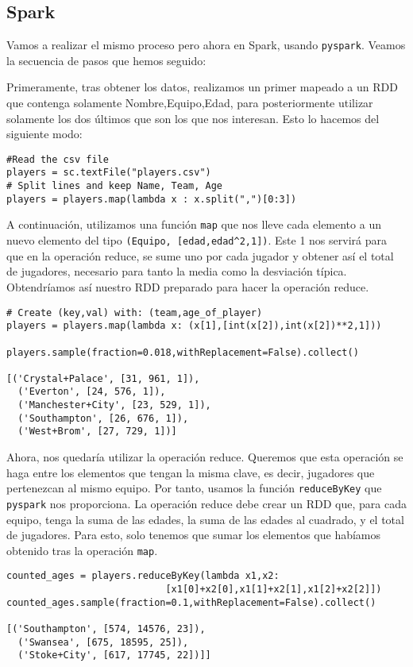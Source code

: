 \documentclass[11pt]{article}
\def\inline{\lstinline[basicstyle=\ttfamily,keywordstyle={}]}
\begin{document}
\subsection{Spark}

Vamos a realizar el mismo proceso pero ahora en Spark, usando \inline{pyspark}. Veamos la secuencia de pasos que hemos seguido:

Primeramente, tras obtener los datos, realizamos un primer mapeado a un RDD que contenga solamente Nombre,Equipo,Edad, para posteriormente utilizar solamente los dos últimos que son los que nos interesan. Esto lo hacemos del siguiente modo:

\begin{verbatim}
#Read the csv file
players = sc.textFile("players.csv")
# Split lines and keep Name, Team, Age
players = players.map(lambda x : x.split(",")[0:3])
\end{verbatim}

A continuación, utilizamos una función \inline{map} que nos lleve cada elemento a un nuevo elemento del tipo \inline{(Equipo, [edad,edad^2,1])}. Este 1 nos servirá para que en la operación reduce, se sume uno por cada jugador y obtener así el total de jugadores, necesario para tanto la media como la desviación típica. Obtendríamos así nuestro RDD preparado para hacer la operación reduce.

\begin{verbatim}
# Create (key,val) with: (team,age_of_player)
players = players.map(lambda x: (x[1],[int(x[2]),int(x[2])**2,1]))

players.sample(fraction=0.018,withReplacement=False).collect()

[('Crystal+Palace', [31, 961, 1]),
  ('Everton', [24, 576, 1]),
  ('Manchester+City', [23, 529, 1]),
  ('Southampton', [26, 676, 1]),
  ('West+Brom', [27, 729, 1])]
\end{verbatim}

Ahora, nos quedaría utilizar la operación reduce. Queremos que esta operación se haga entre los elementos que tengan la misma clave, es decir, jugadores que pertenezcan al mismo equipo. Por tanto, usamos la función \inline{reduceByKey} que \inline{pyspark} nos proporciona. La operación reduce debe crear un RDD que, para cada equipo, tenga la suma de las edades, la suma de las edades al cuadrado, y el total de jugadores. Para esto, solo tenemos que sumar los elementos que habíamos obtenido tras la operación \inline{map}.

\begin{verbatim}
counted_ages = players.reduceByKey(lambda x1,x2:
                            [x1[0]+x2[0],x1[1]+x2[1],x1[2]+x2[2]])
counted_ages.sample(fraction=0.1,withReplacement=False).collect()

[('Southampton', [574, 14576, 23]),
  ('Swansea', [675, 18595, 25]),
  ('Stoke+City', [617, 17745, 22])]]
\end{verbatim}
\end{document}
